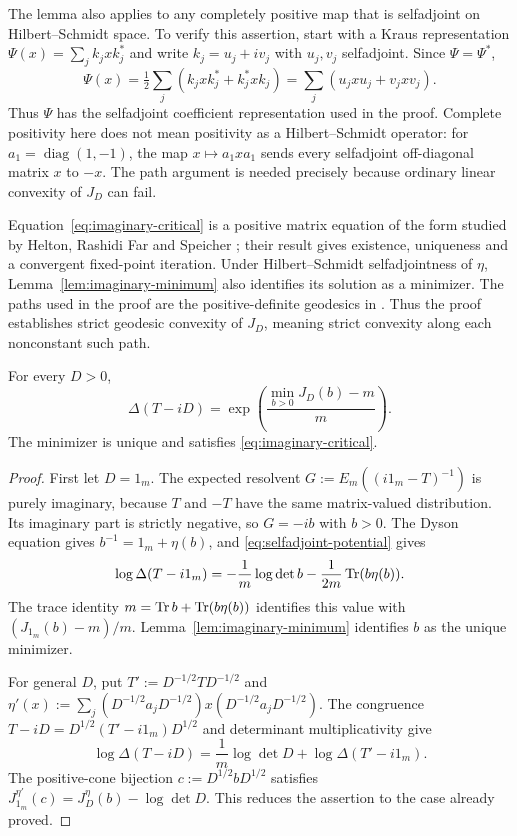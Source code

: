 The lemma also applies to any completely positive map that is selfadjoint on Hilbert--Schmidt space.
To verify this assertion, start with a Kraus representation $\Psi(x)=\sum_j k_jxk_j^*$ and write $k_j=u_j+iv_j$ with $u_j,v_j$ selfadjoint.
Since $\Psi=\Psi^*$,
\[
 \Psi(x)=\tfrac12\sum_j(k_jxk_j^*+k_j^*xk_j)
        =\sum_j(u_jxu_j+v_jxv_j).
\]
Thus $\Psi$ has the selfadjoint coefficient representation used in the proof.
Complete positivity here does not mean positivity as a Hilbert--Schmidt operator: for $a_1=\operatorname{diag}(1,-1)$, the map $x\mapsto a_1xa_1$ sends every selfadjoint off-diagonal matrix $x$ to $-x$.
The path argument is needed precisely because ordinary linear convexity of $J_D$ can fail.

\begin{remark}
\label{rem:positive-cone-context}
Equation~\eqref{eq:imaginary-critical} is a positive matrix equation of the form studied by Helton, Rashidi Far and Speicher \cite[Theorem 2.1]{HRFS07}; their result gives existence, uniqueness and a convergent fixed-point iteration.
Under Hilbert--Schmidt selfadjointness of $\eta$, Lemma~\ref{lem:imaginary-minimum} also identifies its solution as a minimizer.
The paths used in the proof are the positive-definite geodesics in \cite[Section 2, equation (2.2)]{SH15}.
Thus the proof establishes strict geodesic convexity of $J_D$, meaning strict convexity along each nonconstant such path.
\end{remark}

\begin{proposition}\label{prop:imaginary-drift}
For every $D>0$,
\begin{equation}\label{eq:imaginary-determinant}
 \Delta(T-iD)=\exp\left(\frac{\min_{b>0}J_D(b)-m}{m}\right).
\end{equation}
The minimizer is unique and satisfies \eqref{eq:imaginary-critical}.
\end{proposition}
\begin{proof}
First let $D=1_m$.
The expected resolvent $G:=E_m((i1_m-T)^{-1})$ is purely imaginary, because $T$ and $-T$ have the same matrix-valued distribution.
Its imaginary part is strictly negative, so $G=-ib$ with $b>0$.
The Dyson equation gives $b^{-1}=1_m+\eta(b)$, and \eqref{eq:selfadjoint-potential} gives
\[
 \log\Delta(T-i1_m)
   =-\frac1m\log\det b-\frac1{2m}\operatorname{Tr}(b\eta(b)).
\]
The trace identity $m=\operatorname{Tr} b+\operatorname{Tr}(b\eta(b))$ identifies this value with $(J_{1_m}(b)-m)/m$.
Lemma~\ref{lem:imaginary-minimum} identifies $b$ as the unique minimizer.

For general $D$, put $T':=D^{-1/2}TD^{-1/2}$ and $\eta'(x):=\sum_j(D^{-1/2}a_jD^{-1/2})x(D^{-1/2}a_jD^{-1/2})$.
The congruence $T-iD=D^{1/2}(T'-i1_m)D^{1/2}$ and determinant multiplicativity give
\[
 \log\Delta(T-iD)=\frac1m\log\det D+\log\Delta(T'-i1_m).
\]
The positive-cone bijection $c:=D^{1/2}bD^{1/2}$ satisfies $J_{1_m}^{\eta'}(c)=J_D^\eta(b)-\log\det D$.
This reduces the assertion to the case already proved.
\end{proof}

